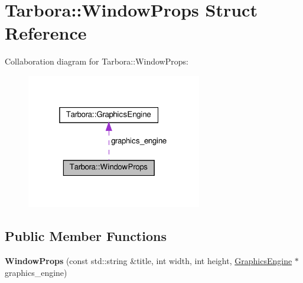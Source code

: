 \hypertarget{structTarbora_1_1WindowProps}{}\section{Tarbora\+:\+:Window\+Props Struct Reference}
\label{structTarbora_1_1WindowProps}


Collaboration diagram for Tarbora\+:\+:Window\+Props\+:
\nopagebreak
\begin{figure}[H]
\begin{center}
\leavevmode
\includegraphics[width=217pt]{structTarbora_1_1WindowProps__coll__graph}
\end{center}
\end{figure}
\subsection*{Public Member Functions}
\begin{DoxyCompactItemize}
\item 
\mbox{\label{structTarbora_1_1WindowProps_a6106ebcc781d54829b580e9e72d48f33}} 
{\bfseries Window\+Props} (const std\+::string \&title, int width, int height, \hyperlink{classTarbora_1_1GraphicsEngine}{Graphics\+Engine} $\ast$graphics\+\_\+engine)
\end{DoxyCompactItemize}

